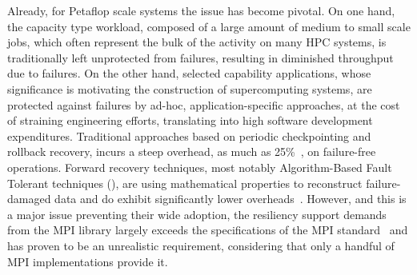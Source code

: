 Already, for Petaflop scale systems the issue has become pivotal. On one hand,
the capacity type workload, composed of a large amount of medium to small
scale jobs, which often represent the bulk of the activity on many HPC systems,
is traditionally left unprotected from failures, resulting in diminished
throughput due to failures. On the other hand, selected capability applications,
whose significance is motivating the construction of supercomputing systems, are
protected against failures by ad-hoc, application-specific approaches, at the
cost of straining engineering efforts, translating into high software development
expenditures.
Traditional approaches based on periodic checkpointing and rollback recovery,
incurs a steep overhead, as much as 25\%~\cite{Schroeder:2007tp}, on
failure-free operations. Forward recovery techniques, most notably
Algorithm-Based Fault Tolerant techniques (\abft), are
using mathematical properties to reconstruct failure-damaged data and do exhibit
significantly lower overheads~\cite{luk1988analysis}. However, and this is a major issue preventing
their wide adoption, the resiliency support \abft demands from the MPI library
largely exceeds the specifications of the MPI standard~\cite{MPI22} and has
proven to be an unrealistic requirement, considering that only a handful of MPI
implementations provide it.


